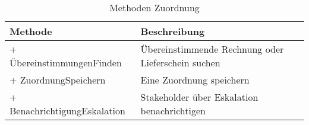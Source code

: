 \begin{table}[ht!]
\centering
\caption{Methoden Zuordnung}
\label{tab:MethodenZuordnung}
\begin{tabularx}{\linewidth}{@{}lX@{}}
\toprule
Methode                     & Beschreibung              \\ \midrule
+ ÜbereinstimmungenFinden & Übereinstimmende Rechnung oder Lieferschein suchen  \\
+ ZuordnungSpeichern        & Eine Zuordnung speichern \\
+ BenachrichtigungEskalation & Stakeholder über Eskalation benachrichtigen \\ \bottomrule
\end{tabularx}
\end{table}
